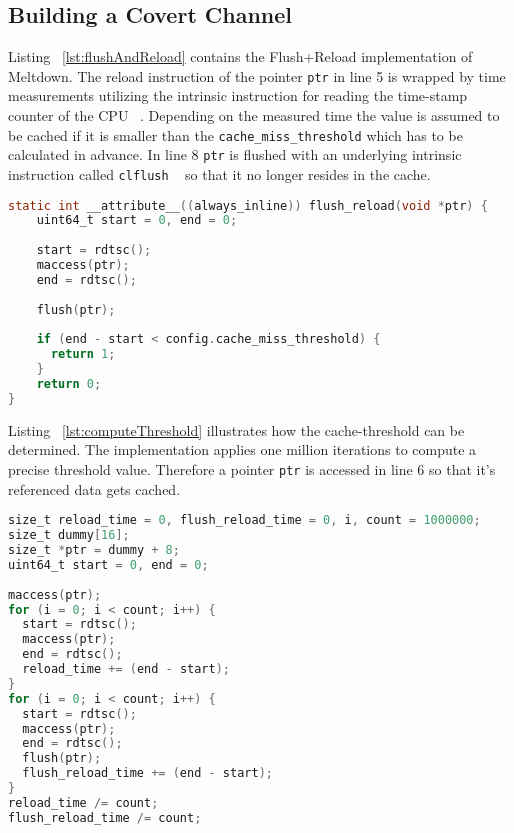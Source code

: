\documentclass[a4paper,oneside,openright] {scrreprt}
\begin{document}
\subsection{Building a Covert Channel}
\label{ch:intro:motivation:A}

Listing ~\ref{lst:flushAndReload} contains the Flush+Reload implementation of Meltdown. 
The reload instruction of the pointer \texttt{ptr} in line 5 is wrapped 
by time measurements utilizing the intrinsic instruction for reading the time-stamp counter of the CPU ~\cite{intelintrinsics}. 
Depending on the measured time the value is assumed to be cached if it is smaller
than the \texttt{cache\_miss\_threshold} which has to be calculated in advance.
In line 8 \texttt{ptr} is flushed with an underlying intrinsic instruction called \texttt{clflush} ~\cite{intelintrinsics}
so that it no longer resides in the cache.

\begin{lstlisting}[language=C, caption=Meltdown: Flush+Reload, label={lst:flushAndReload}]
static int __attribute__((always_inline)) flush_reload(void *ptr) {
    uint64_t start = 0, end = 0;
  
    start = rdtsc();
    maccess(ptr);
    end = rdtsc();
  
    flush(ptr);
  
    if (end - start < config.cache_miss_threshold) {
      return 1;
    }
    return 0;
}
\end{lstlisting}

Listing ~\ref{lst:computeThreshold} illustrates how the cache-threshold can be determined.
The implementation applies one million iterations to compute a precise threshold value.
Therefore a pointer \texttt{ptr} is accessed in line 6 so that it's referenced data gets cached. 

\begin{lstlisting}[language=C, caption=Meltdown: Cache Miss Threshold 1, label={lst:computeThreshold}]
size_t reload_time = 0, flush_reload_time = 0, i, count = 1000000;
size_t dummy[16];
size_t *ptr = dummy + 8;
uint64_t start = 0, end = 0;
  
maccess(ptr);
for (i = 0; i < count; i++) {
  start = rdtsc();
  maccess(ptr);
  end = rdtsc();
  reload_time += (end - start);
}
for (i = 0; i < count; i++) {
  start = rdtsc();
  maccess(ptr);
  end = rdtsc();
  flush(ptr);
  flush_reload_time += (end - start);
}
reload_time /= count;
flush_reload_time /= count;
\end{lstlisting}
\end{document}

